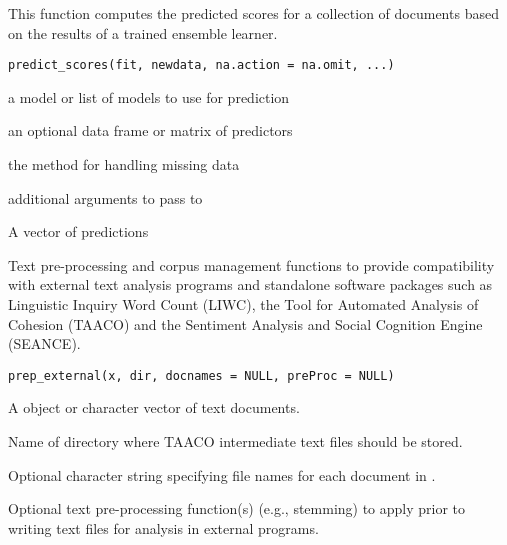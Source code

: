 \documentclass[a4paper]{book}
\begin{document}
%
\begin{Description}\relax
This function computes the predicted scores for a collection of documents based on the
results of a trained ensemble learner.
\end{Description}
%
\begin{Usage}
\begin{verbatim}
predict_scores(fit, newdata, na.action = na.omit, ...)
\end{verbatim}
\end{Usage}
%
\begin{Arguments}
\begin{ldescription}
\item[\code{fit}] a model or list of models to use for prediction

\item[\code{newdata}] an optional data frame or matrix of predictors

\item[\code{na.action}] the method for handling missing data

\item[\code{...}] additional arguments to pass to 
\end{ldescription}
\end{Arguments}
%
\begin{Value}
A vector of predictions
\end{Value}
%
\begin{Description}\relax
Text pre-processing and corpus management functions to provide compatibility
with external text analysis programs and standalone software packages such as
Linguistic Inquiry Word Count (LIWC), the Tool for Automated Analysis of
Cohesion (TAACO) and the Sentiment Analysis and Social Cognition Engine (SEANCE).
\end{Description}
%
\begin{Usage}
\begin{verbatim}
prep_external(x, dir, docnames = NULL, preProc = NULL)
\end{verbatim}
\end{Usage}
%
\begin{Arguments}
\begin{ldescription}
\item[\code{x}] A  object or character vector of text documents.

\item[\code{dir}] Name of directory where TAACO intermediate text files should be
stored.

\item[\code{docnames}] Optional character string specifying file names for each
document in .

\item[\code{preProc}] Optional text pre-processing function(s) (e.g., stemming) to apply prior to writing text files
for analysis in external programs.
\end{ldescription}
\end{Arguments}
\end{document}
